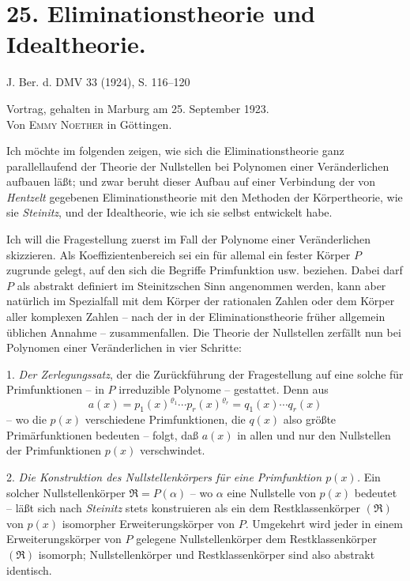 \section*{25. Eliminationstheorie und Idealtheorie.}

\begin{center}
J. Ber. d. DMV 33 (1924), S. 116--120
\end{center}

\setcounter{footnote}{0}

\begin{center}
Vortrag, gehalten in Marburg am 25. September 1923.\\[0.5em]
Von \textsc{Emmy Noether} in Göttingen.
\end{center}

Ich möchte im folgenden zeigen, wie sich die Eliminationstheorie ganz parallellaufend der Theorie der Nullstellen bei Polynomen einer Veränderlichen aufbauen läßt; und zwar beruht dieser Aufbau auf einer Verbindung der von \emph{Hentzelt} gegebenen Eliminationstheorie mit den Methoden der Körpertheorie, wie sie \emph{Steinitz}, und der Idealtheorie, wie ich sie selbst entwickelt habe.

Ich will die Fragestellung zuerst im Fall der Polynome einer Veränderlichen skizzieren. Als Koeffizientenbereich sei ein für allemal ein fester Körper $P$ zugrunde gelegt, auf den sich die Begriffe Primfunktion usw. beziehen. Dabei darf $P$ als abstrakt definiert im Steinitzschen Sinn angenommen werden, kann aber natürlich im Spezialfall mit dem Körper der rationalen Zahlen oder dem Körper aller komplexen Zahlen -- nach der in der Eliminationstheorie früher allgemein üblichen Annahme -- zusammenfallen. Die Theorie der Nullstellen zerfällt nun bei Polynomen einer Veränderlichen in vier Schritte:

1. \emph{Der Zerlegungssatz}, der die Zurückführung der Fragestellung auf eine solche für Primfunktionen -- in $P$ irreduzible Polynome -- gestattet. Denn aus
\[
 a(x)=p_1(x)^{\varrho_1}\cdots p_r(x)^{\varrho_r}=q_1(x)\cdots q_r(x)
\]
-- wo die $p(x)$ verschiedene Primfunktionen, die $q(x)$ also \glqq{}größte Primärfunktionen\grqq{} bedeuten -- folgt, daß $a(x)$ in allen und nur den Nullstellen der Primfunktionen $p(x)$ verschwindet.

2. \emph{Die Konstruktion des Nullstellenkörpers für eine Primfunktion $p(x)$.} Ein solcher Nullstellenkörper $\mathfrak R=P(\alpha)$ -- wo $\alpha$ eine Nullstelle von $p(x)$ bedeutet -- läßt sich nach \emph{Steinitz} stets konstruieren als ein dem Restklassenkörper $(\mathfrak R)$ von $p(x)$ isomorpher Erweiterungskörper von $P$. Umgekehrt wird jeder in einem Erweiterungskörper von $P$ gelegene Nullstellenkörper dem Restklassenkörper $(\mathfrak R)$ isomorph; Nullstellenkörper und Restklassenkörper sind also abstrakt identisch.

